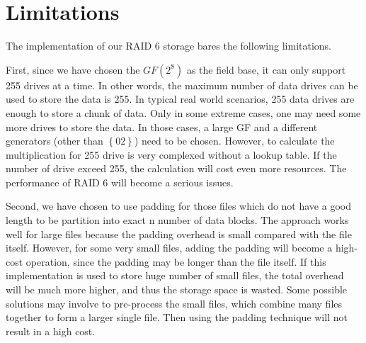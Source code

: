 \section{Limitations}

The implementation of our RAID 6 storage bares the following limitations. 

First, since we have chosen the $GF(2^8)$ as the field base, it can only support 255 drives at a time. In other words, the maximum number of data drives can be used to store the data is 255. In typical real world scenarios, 255 data drives are enough to store a chunk of data. Only in some extreme cases, one may need some more drives to store the data. In those cases, a large GF and a different generators (other than $\left\{02\right\}$) need to be chosen. However, to calculate the multiplication for 255 drive is very complexed without a lookup table. If the number of drive exceed 255, the calculation will cost even more resources. The performance of RAID 6 will become a serious issues.

Second, we have chosen to use padding for those files which do not have a good length to be partition into exact n number of data blocks. The approach works well for large files because the padding overhead is small compared with the file itself. However, for some very small files, adding the padding will become a high-cost operation, since the padding may be longer than the file itself. If this implementation is used to store huge number of small files, the total overhead will be much more higher, and thus the storage space is wasted. Some possible solutions may involve to pre-process the small files, which combine many files together to form a larger single file. Then using the padding technique will not result in a high cost.
